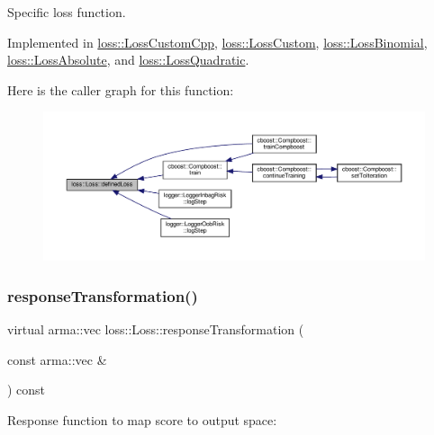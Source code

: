 Specific loss function. 



Implemented in \hyperlink{classloss_1_1_loss_custom_cpp_abb0c51701c90ce115cd0a0440e5b28f8}{loss\+::\+Loss\+Custom\+Cpp}, \hyperlink{classloss_1_1_loss_custom_ad71351d35d7739651c487c2106571118}{loss\+::\+Loss\+Custom}, \hyperlink{classloss_1_1_loss_binomial_a396a06f762b735f83af21bdd4ba8fe9c}{loss\+::\+Loss\+Binomial}, \hyperlink{classloss_1_1_loss_absolute_af10b320d7253ef4f566530717441059e}{loss\+::\+Loss\+Absolute}, and \hyperlink{classloss_1_1_loss_quadratic_a7495a0d225ae5470840e8f377419d7cf}{loss\+::\+Loss\+Quadratic}.

Here is the caller graph for this function\+:
\nopagebreak
\begin{figure}[H]
\begin{center}
\leavevmode
\includegraphics[width=350pt]{classloss_1_1_loss_ae9f94dd9b8311397583ba3a9cb485e94_icgraph}
\end{center}
\end{figure}
\mbox{\label{classloss_1_1_loss_a0a84b7df79b08e40b538aaa7e6ee75c4}} 
\subsubsection{\texorpdfstring{response\+Transformation()}{responseTransformation()}}
{\footnotesize\ttfamily virtual arma\+::vec loss\+::\+Loss\+::response\+Transformation (\begin{DoxyParamCaption}\item[{const arma\+::vec \&}]{ }\end{DoxyParamCaption}) const\hspace{0.3cm}{\ttfamily [pure virtual]}}



Response function to map score to output space\+: 



